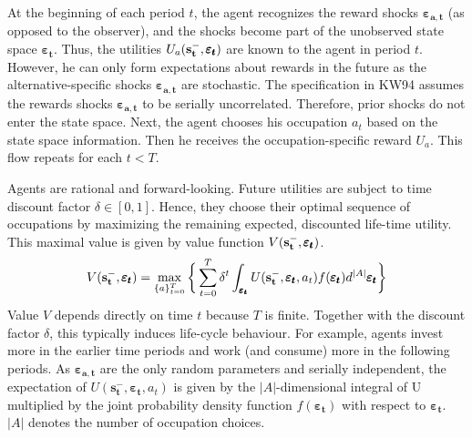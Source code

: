 \noindent
At the beginning of each period $t$, the agent recognizes the reward shocks $\pmb{\varepsilon_{a,t}}$ (as opposed to the observer), and the shocks become part of the unobserved state space $\pmb{\varepsilon_t}$. Thus, the utilities $U_a(\bold{s_t^-}, \pmb{\varepsilon_t})$ are known to the agent in period $t$. However, he can only form expectations about rewards in the future as the alternative-specific shocks $\pmb{\varepsilon_{a,t}}$ are stochastic. The specification in KW94 assumes the rewards shocks $\pmb{\varepsilon_{a,t}}$ to be serially uncorrelated. Therefore, prior shocks do not enter the state space. Next, the agent chooses his occupation $a_t$ based on the state space information. Then he receives the occupation-specific reward $U_a$. This flow repeats for each $t < T$.

Agents are rational and forward-looking. Future utilities are subject to time discount factor $\delta  \in [0,1]$. Hence, they choose their optimal sequence of occupations by maximizing the remaining expected, discounted life-time utility. This maximal value is given by value function $V(\bold{s_t^-}, \pmb{\varepsilon_t})$.
\begin{align}
V(\bold{s_t^-}, \pmb{\varepsilon_t}) = \max_{\{a\}_{t=0}^T} \bigg\{ \sum_{t=0}^T \delta^t \int_{\pmb{\varepsilon_t}} U(\bold{s_{t}^{-}},\pmb{\varepsilon_{t}}, a_{t}) f(\pmb{\varepsilon_{t}})d^{|A|}\pmb{\varepsilon_{t}}\bigg\}
\end{align}
Value $V$ depends directly on time $t$ because $T$ is finite. Together with the discount factor $\delta$, this typically induces life-cycle behaviour. For example, agents invest more in the earlier time periods and work (and consume) more in the following periods. As $\pmb{\varepsilon_{a,t}}$ are the only random parameters and serially independent, the expectation of $U(\bm{s_{t}^{-}},\pmb{\varepsilon_{t}}, a_{t})$ is given by the $|A|$-dimensional integral of U multiplied by the joint probability density function $f(\pmb{\varepsilon_{t}})$ with respect to $\pmb{\varepsilon_{t}}$. $|A|$ denotes the number of occupation choices.

